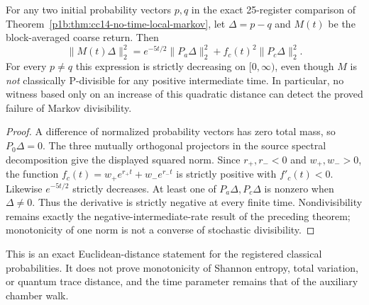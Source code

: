 \documentclass[11pt]{article}
\begin{document}
\begin{corollary}
\label{p1b:cor:cc15-no-quadratic-backflow}
For any two initial probability vectors $p,q$ in the exact
25-register comparison of Theorem~\ref{p1b:thm:cc14-no-time-local-markov},
let $\Delta=p-q$ and $M(t)$ be the block-averaged coarse return. Then
\[
 \boxed{\|M(t)\Delta\|_2^2=
 e^{-5t/2}\|P_a\Delta\|_2^2+
 f_c(t)^2\|P_c\Delta\|_2^2.}
\]
For every $p\ne q$ this expression is strictly decreasing on
$[0,\infty)$, even though $M$ is \emph{not} classically
P-divisible for any positive intermediate time.
In particular, no witness based only on an increase of this quadratic
distance can detect the proved failure of Markov divisibility.
\end{corollary}
\begin{proof}
A difference of normalized probability vectors has zero total mass,
so $P_0\Delta=0$. The three mutually orthogonal projectors in the
source spectral decomposition give the displayed squared norm.
Since $r_+,r_-<0$ and $w_+,w_->0$, the function
$f_c(t)=w_+e^{r_+t}+w_-e^{r_-t}$ is strictly positive with
$f'_c(t)<0$.  Likewise $e^{-5t/2}$ strictly decreases. At least one
of $P_a\Delta,P_c\Delta$ is nonzero when $\Delta\ne0$.
Thus the derivative is strictly negative at every finite time.
Nondivisibility remains exactly the negative-intermediate-rate
result of the preceding theorem; monotonicity of one norm is not
a converse of stochastic divisibility.
\end{proof}
\begin{remark}
This is an exact Euclidean-distance statement for the registered
classical probabilities. It does not prove monotonicity of Shannon
entropy, total variation, or quantum trace distance, and the time
parameter remains that of the auxiliary chamber walk.
\end{remark}
\end{document}
